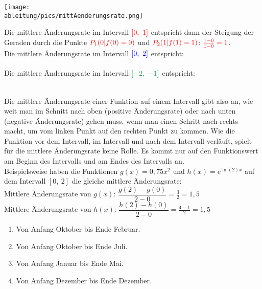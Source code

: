 \begin{minipage}{\textwidth}
	\begin{minipage}{0.49\textwidth}
		\centering\texttt{[image: \\ableitung/pics/mittAenderungsrate.png]}
	\end{minipage}
	\begin{minipage}{0.49\textwidth}
		Die mittlere Änderungsrate im Intervall \(\textcolor{red}{[0,\ 1]}\) entspricht dann der Steigung der Geraden durch die Punkte \(\textcolor{red}{P_1(0|f(0)=0)}\) und \(\textcolor{red}{P_2(1|f(1)=1)}\): \(\textcolor{red}{\frac{1-0}{1-0}=1}\).\\
		Die mittlere Änderungsrate im Intervall \(\textcolor{blue}{[0,\ 2]}\) entspricht:\\
		\(\textcolor{loes}{\frac{4-0}{2-0}=2}\)\vspace{0.5cm}\\
		Die mittlere Änderungsrate im Intervall \(\textcolor{ForestGreen}{[-2,\ -1]}\) entspricht:\\
		\(\textcolor{loes}{\frac{1-4}{-1-(-2)}=-3}\)\vspace{1cm}
	\end{minipage}
\end{minipage}\vspace{.5cm}
Die mittlere Änderungsrate einer Funktion auf einem Intervall gibt also an, wie weit man im Schnitt nach oben (positive Änderungsrate) oder nach unten (negative Änderungsrate) gehen muss, wenn man einen Schritt nach rechts macht, um vom linken Punkt auf den rechten Punkt zu kommen. Wie die Funktion vor dem Intervall, im Intervall und nach dem Intervall verläuft, spielt für die mittlere Änderungsrate keine Rolle. Es kommt nur auf den Funktionswert am Beginn des Intervalls und am Endes des Intervalls an.\\
Beispielsweise haben die Funktionen \(g(x)=0,75x^2\) und \(h(x)=e^{\ln(2)x}\) auf dem Intervall \([0,\ 2]\) die gleiche mittlere Änderungsrate:\\
Mittlere Änderungsrate von \(g(x)\): \(\dfrac{g(2)-g(0)}{2-0}=\frac{3}{2}=1,5\)\\
Mittlere Änderungsrate von \(h(x)\): \(\dfrac{h(2)-h(0)}{2-0}=\frac{4-1}{2}=1,5\)
\newpage
\begin{minipage}{\textwidth}
	\begin{Exercise}[title={Bestimme die durchschnittliche Änderungsrate des DAX für folgende Zeiträume jeweils pro Monat.}, label=aenderungsrateA1]
		\begin{enumerate}[label=\alph*)]
			\item Von Anfang Oktober bis Ende Februar.
			\item Von Anfang Oktober bis Ende Juli.
			\item Von Anfang Januar bis Ende Mai.
			\item Von Anfang Dezember bis Ende Dezember.
		\end{enumerate}
	\end{Exercise}
\end{minipage}
